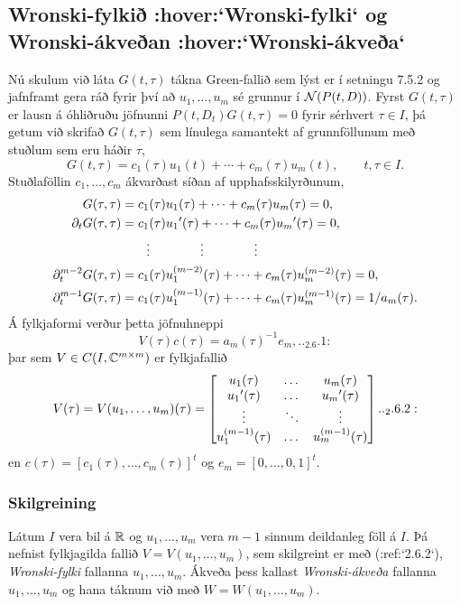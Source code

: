 \subsection{Wronski-fylkið :hover:`Wronski-fylki` og
Wronski-ákveðan :hover:`Wronski-ákveða`}

\noindent
Nú skulum við láta $G(t,\tau)$ tákna Green-fallið sem lýst er í
setningu 7.5.2 og jafnframt gera ráð fyrir því að $u_1,\dots, u_m$ sé
grunnur í ${\cal N}(P(t,D))$.  Fyrst $G(t,\tau)$ er lausn á óhliðruðu
jöfnunni   $P(t,D_t)G(t,\tau)=0$
fyrir sérhvert  $\tau\in I$, þá getum við skrifað
$G(t,\tau)$ sem línulega samantekt af grunnföllunum með stuðlum sem
eru háðir $\tau$,
$$
G(t,\tau)=c_1(\tau)u_1(t)+\cdots+c_m(\tau)u_m(t), \qquad t,\tau\in I.
$$
Stuðlaföllin $c_1,\dots,c_m$ ákvarðast síðan af upphafsskilyrðunum,
\begin{align*}
G(\tau,\tau) &= c_1(\tau)u_1(\tau)+\cdots+c_m(\tau)u_m(\tau)=0,\\
\partial_tG(\tau,\tau) &= c_1(\tau)u_1{\sp{\prime}}(\tau)+
\cdots+c_m(\tau)u_m{\sp{\prime}}(\tau)=0,\\
&\qquad\vdots\qquad\qquad\vdots\qquad\qquad\vdots\\
\partial_t\sp{m-2}G(\tau,\tau) &= c_1(\tau)u_1\sp{(m-2)}(\tau)+
\cdots+c_m(\tau)u_m\sp{(m-2)}(\tau)=0,\\
\partial_t\sp{m-1}G(\tau,\tau) &= c_1(\tau)u_1\sp{(m-1)}(\tau)+
\cdots+c_m(\tau)u_m\sp{(m-1)}(\tau)=1/a_m({\tau}).
\end{align*}
Á fylkjaformi verður þetta jöfnuhneppi
 \begin{equation*}V(\tau)c(\tau)=a_m({\tau})^{-1}e_m,

.. _2.6.1:

 \end{equation*}
þar sem $V\in C(I,{\mathbb C}\sp{m\times m})$ er fylkjafallið
 \begin{equation*}V(\tau)=V(u_1,\dots,u_m)(\tau)=
\left[\begin{matrix}
u_1(\tau)&\dots&u_m(\tau)\\
u_1\dash(\tau)&\dots&u_m\dash(\tau)\\
\vdots&\ddots&\vdots\\
u_1\sp{(m-1)}(\tau)&\dots&u_m\sp{(m-1)}(\tau)
\end{matrix}\right]


.. _2.6.2:

 \end{equation*}
en $c(\tau)=[c_1(\tau),\dots,c_m(\tau)]^t$ og $e_m=[0,\dots,0,1]^t$.

\subsubsection{Skilgreining}
Látum $I$ vera bil á ${\mathbb R}$ og $u_1,\dots,u_m$ vera $m-1$ sinnum
deildanleg föll á $I$.  Þá nefnist fylkjagilda fallið
$V=V(u_1,\dots,u_m)$, sem skilgreint er með (:ref:`2.6.2`),  {\it Wronski-fylki}
fallanna $u_1,\dots, u_m$.  Ákveða þess kallast {\it Wronski-ákveða}
fallanna $u_1,\dots, u_m$ og hana táknum við með 
$W=W(u_1,\dots,u_m)$.


